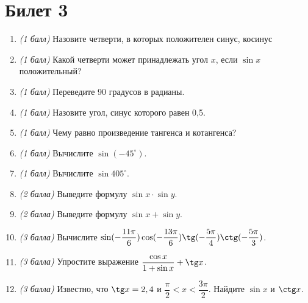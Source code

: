\documentclass[12pt, a4paper]{article}
\begin{document}
\section*{Билет 3}
\begin{enumerate}
	\item \textit{(1 балл)} Назовите четверти, в которых положителен синус, косинус
	\item \textit{(1 балл)} Какой четверти может принадлежать угол $x$, если $\sin x$ положительный?
	\item \textit{(1 балл)} Переведите 90 градусов в радианы.
	\item \textit{(1 балл)} Назовите угол, синус которого равен 0,5.
	\item \textit{(1 балл)} Чему равно произведение тангенса и котангенса?
	\item \textit{(1 балл)} Вычислите $\sin (-45^{\circ})$.
	\item \textit{(1 балл)} Вычислите $\sin 405^{\circ}$.
	\item \textit{(2 балла)} Выведите формулу $\sin x \cdot \sin y$.
	\item \textit{(2 балла)} Выведите формулу $\sin x + \sin y$.
	\item \textit{(3 балла)} Вычислите $\sin (-\dfrac{11\pi}{6}) \cos (-\dfrac{13\pi}{6}) \tg (-\dfrac{5\pi}{4}) \ctg (-\dfrac{5\pi}{3})$.
	\item \textit{(3 балла)} Упростите выражение $\dfrac{\cos x}{1+\sin x}+ \tg x$.
	\item \textit{(3 балла)} Известно, что $\tg x=2,4$ и $\dfrac{\pi}{2}<x<\dfrac{3\pi}{2}$. Найдите $\sin x$ и $\ctg x$.
\end{enumerate}
\end{document}
